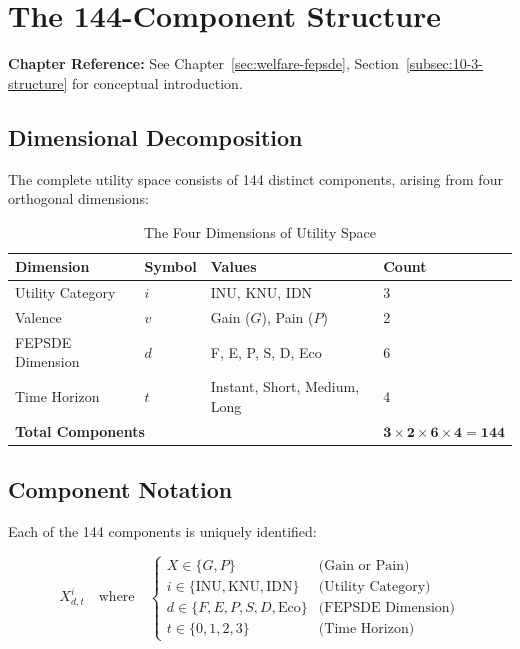 \section{The 144-Component Structure}
\label{sec:app-c-structure}

\begin{cross-reference}
\textbf{Chapter Reference:} See Chapter~\ref{sec:welfare-fepsde}, 
Section~\ref{subsec:10-3-structure} for conceptual introduction.
\end{cross-reference}

\subsection{Dimensional Decomposition}

The complete utility space consists of 144 distinct components, arising from 
four orthogonal dimensions:

\begin{table}[htbp]
\centering
\caption{The Four Dimensions of Utility Space}
\label{tab:app-c-dimensions}
\renewcommand{\arraystretch}{1.4}
\begin{tabular}{@{}llll@{}}
\toprule
\textbf{Dimension} & \textbf{Symbol} & \textbf{Values} & \textbf{Count} \\
\midrule
Utility Category & $i$ & INU, KNU, IDN & 3 \\
Valence & $v$ & Gain ($G$), Pain ($P$) & 2 \\
FEPSDE Dimension & $d$ & F, E, P, S, D, Eco & 6 \\
Time Horizon & $t$ & Instant, Short, Medium, Long & 4 \\
\midrule
\multicolumn{3}{l}{\textbf{Total Components}} & $\mathbf{3 \times 2 \times 6 \times 4 = 144}$ \\
\bottomrule
\end{tabular}
\end{table}

\subsection{Component Notation}

Each of the 144 components is uniquely identified:

\begin{equation}
X^i_{d,t} \quad \text{where} \quad 
\begin{cases}
X \in \{G, P\} & \text{(Gain or Pain)} \\
i \in \{\text{INU}, \text{KNU}, \text{IDN}\} & \text{(Utility Category)} \\
d \in \{F, E, P, S, D, \text{Eco}\} & \text{(FEPSDE Dimension)} \\
t \in \{0, 1, 2, 3\} & \text{(Time Horizon)}
\end{cases}
\end{equation}

